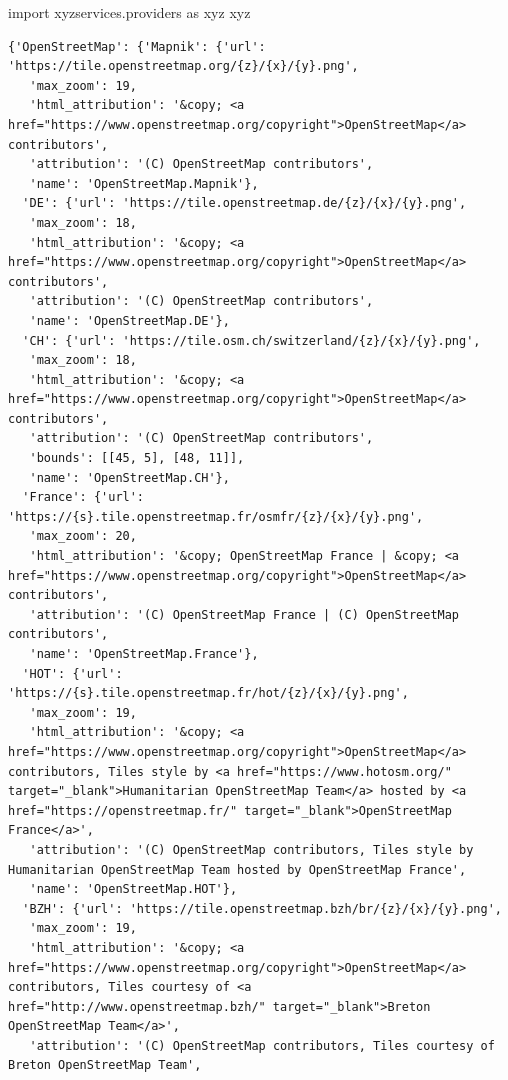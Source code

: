 \documentclass[
  letterpaper,
  DIV=11,
  numbers=noendperiod]{scrreprt}
\newenvironment{Shaded}{\begin{snugshade}}{\end{snugshade}}
\newcommand{\ImportTok}[1]{\textcolor[rgb]{0.00,0.46,0.62}{#1}}
\newcommand{\NormalTok}[1]{\textcolor[rgb]{0.00,0.23,0.31}{#1}}
\begin{document}
\begin{Shaded}
\begin{Highlighting}[]
\ImportTok{import}\NormalTok{ xyzservices.providers }\ImportTok{as}\NormalTok{ xyz}
\NormalTok{xyz}
\end{Highlighting}
\end{Shaded}

\begin{verbatim}
{'OpenStreetMap': {'Mapnik': {'url': 'https://tile.openstreetmap.org/{z}/{x}/{y}.png',
   'max_zoom': 19,
   'html_attribution': '&copy; <a href="https://www.openstreetmap.org/copyright">OpenStreetMap</a> contributors',
   'attribution': '(C) OpenStreetMap contributors',
   'name': 'OpenStreetMap.Mapnik'},
  'DE': {'url': 'https://tile.openstreetmap.de/{z}/{x}/{y}.png',
   'max_zoom': 18,
   'html_attribution': '&copy; <a href="https://www.openstreetmap.org/copyright">OpenStreetMap</a> contributors',
   'attribution': '(C) OpenStreetMap contributors',
   'name': 'OpenStreetMap.DE'},
  'CH': {'url': 'https://tile.osm.ch/switzerland/{z}/{x}/{y}.png',
   'max_zoom': 18,
   'html_attribution': '&copy; <a href="https://www.openstreetmap.org/copyright">OpenStreetMap</a> contributors',
   'attribution': '(C) OpenStreetMap contributors',
   'bounds': [[45, 5], [48, 11]],
   'name': 'OpenStreetMap.CH'},
  'France': {'url': 'https://{s}.tile.openstreetmap.fr/osmfr/{z}/{x}/{y}.png',
   'max_zoom': 20,
   'html_attribution': '&copy; OpenStreetMap France | &copy; <a href="https://www.openstreetmap.org/copyright">OpenStreetMap</a> contributors',
   'attribution': '(C) OpenStreetMap France | (C) OpenStreetMap contributors',
   'name': 'OpenStreetMap.France'},
  'HOT': {'url': 'https://{s}.tile.openstreetmap.fr/hot/{z}/{x}/{y}.png',
   'max_zoom': 19,
   'html_attribution': '&copy; <a href="https://www.openstreetmap.org/copyright">OpenStreetMap</a> contributors, Tiles style by <a href="https://www.hotosm.org/" target="_blank">Humanitarian OpenStreetMap Team</a> hosted by <a href="https://openstreetmap.fr/" target="_blank">OpenStreetMap France</a>',
   'attribution': '(C) OpenStreetMap contributors, Tiles style by Humanitarian OpenStreetMap Team hosted by OpenStreetMap France',
   'name': 'OpenStreetMap.HOT'},
  'BZH': {'url': 'https://tile.openstreetmap.bzh/br/{z}/{x}/{y}.png',
   'max_zoom': 19,
   'html_attribution': '&copy; <a href="https://www.openstreetmap.org/copyright">OpenStreetMap</a> contributors, Tiles courtesy of <a href="http://www.openstreetmap.bzh/" target="_blank">Breton OpenStreetMap Team</a>',
   'attribution': '(C) OpenStreetMap contributors, Tiles courtesy of Breton OpenStreetMap Team',

\end{verbatim}
\end{document}
